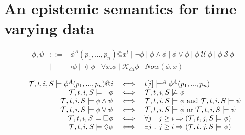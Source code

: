 \documentclass{article}
\newcommand{\sch}{\textit{ch}}
\newcommand{\tr}{t}
\newcommand{\tset}{\mathcal{T}}
\newcommand{\tnext}{\mathcal{X}}
\newcommand{\talways}{\square}
\newcommand{\tevent}{\lozenge}
\newcommand{\tuntil}{~\mathcal{U}~}
\newcommand{\tsince}{~\mathcal{S}~}
\newcommand{\tknows}[1]{\mathcal{K}_{#1}}
\begin{document}
\section{An epistemic semantics for time varying data}


\begin{figure*}[t]
  \begin{displaymath}
    \begin{array}{rcl}
      \phi, \psi & ::= &
      \phi^A ( p_1 , ..., p_n ) @ x^t
      \mid \neg \phi
      \mid \phi \wedge \phi
      \mid \phi \vee \phi
      \mid \phi \tuntil \phi
      \mid \phi \tsince \phi \\
      & \mid & \talways \phi
      \mid \tevent \phi
      \mid \forall x . \phi
      \mid \tknows{\sch} \phi
      \mid Now(\phi,x)
    \end{array}
  \end{displaymath}

  \begin{displaymath}
    \begin{array}{rcl}
      \tset, \tr, i , S \models \phi^A ( p_1 , ..., p_n ) @ i & \iff &
      \tr[i] \models^A \phi^A ( p_1 , ..., p_n )  \\

      \tset, \tr, i , S \models \neg \phi & \iff &
      \tset, \tr, i , S \not \models \phi \\

      \tset, \tr, i , S \models \phi \land \psi & \iff &
      \tset, \tr, i , S \models \phi \hbox{ and } \tset, \tr, i , S \models \psi \\

      \tset, \tr, i , S \models \phi \lor \psi & \iff &
      \tset, \tr, i , S \models \phi \hbox{ or } \tset, \tr, i , S \models \psi \\


      \tset, \tr, i , S \models \talways \phi & \iff &
      \forall j ~.~ j \geq i \Rightarrow (\tset, \tr, j , S \models \phi) \\

      \tset, \tr, i , S \models \tevent \phi & \iff &
      \exists j ~.~ j \geq i \Rightarrow (\tset, \tr, j , S \models \phi) \\


\end{array}
\end{displaymath}
\end{figure*}
\end{document}
